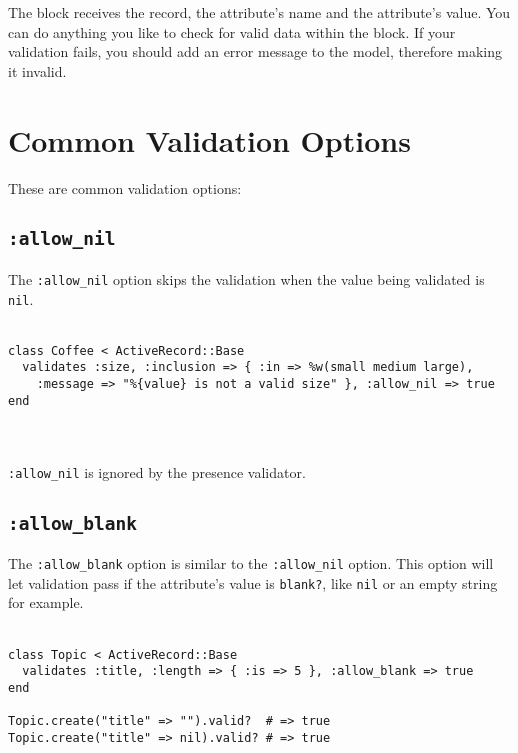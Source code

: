 \documentclass[10pt]{book}
\begin{document}
The block receives the record, the attribute’s name and the  attribute’s value. You can do anything you like to check for valid data  within the block. If your validation fails, you should add an error  message to the model, therefore making it invalid.

\section{ Common Validation Options}

These are common validation options:

\subsection{ \texttt{:allow\_nil}}

The \texttt{:allow\_nil} option skips the validation when the value being validated is \texttt{nil}.
\\ \\
\begin{minipage}{\textwidth}{\scriptsize
\begin{verbatim}
class Coffee < ActiveRecord::Base
  validates :size, :inclusion => { :in => %w(small medium large),
    :message => "%{value} is not a valid size" }, :allow_nil => true
end
\end{verbatim}}
\end{minipage}
\\ \\

\texttt{:allow\_nil} is ignored by the presence validator.

\subsection{ \texttt{:allow\_blank}}

The \texttt{:allow\_blank} option is similar to the \texttt{:allow\_nil} option. This option will let validation pass if the attribute’s value is \texttt{blank?}, like \texttt{nil} or an empty string for example.
\\ \\
\begin{minipage}{\textwidth}{\scriptsize
\begin{verbatim}
class Topic < ActiveRecord::Base
  validates :title, :length => { :is => 5 }, :allow_blank => true
end
 
Topic.create("title" => "").valid?  # => true
Topic.create("title" => nil).valid? # => true
\end{verbatim}}
\end{minipage}
\\ \\
\end{document}
